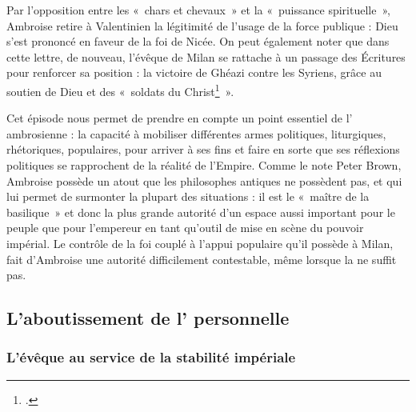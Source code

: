 \bigskip

Par l'opposition entre les «~chars et chevaux~» et la «~puissance spirituelle~», Ambroise retire à Valentinien la légitimité de l'usage de la force publique : Dieu s'est prononcé en faveur de la foi de Nicée. On peut également noter que dans cette lettre, de nouveau, l'évêque de Milan se rattache à un passage des Écritures pour renforcer sa position : la victoire de Ghéazi contre les Syriens, grâce au soutien de Dieu et des «~soldats du Christ\footnote{\cite[, 11]{ambroise_lettres}.}~».

\bigskip

Cet épisode nous permet de prendre en compte un point essentiel de l' ambrosienne : la capacité à mobiliser différentes armes politiques, liturgiques, rhétoriques, populaires, pour arriver à ses fins et faire en sorte que ses réflexions politiques se rapprochent de la réalité de l'Empire. Comme le note Peter Brown, Ambroise possède un atout que les philosophes antiques ne possèdent pas, et qui lui permet de surmonter la plupart des situations : il est le «~maître de la basilique~» et donc la plus grande autorité d'un espace aussi important pour le peuple que pour l'empereur en tant qu'outil de mise en scène du pouvoir impérial\autocite[156]{brown_power_1992}. Le contrôle de la foi couplé à l'appui populaire qu'il possède à Milan, fait d'Ambroise une autorité difficilement contestable, même lorsque la  ne suffit pas.

\subsection{L'aboutissement de l' personnelle}

\subsubsection{L'évêque au service de la stabilité impériale}

